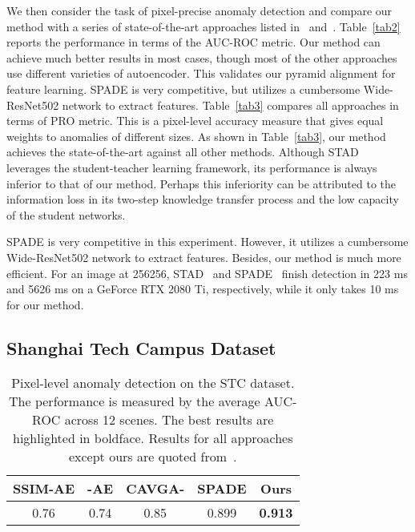 \documentclass[final]{cvpr}
\begin{document}
{We then consider the task of pixel-precise anomaly detection and compare our method with a series of state-of-the-art approaches listed in~\cite{Cohen2020} and~\cite{Bergmann2020}. Table~\ref{tab2} reports the performance in terms of the AUC-ROC metric. Our method can achieve much better results in most cases, though most of the other approaches use different varieties of autoencoder. This validates our pyramid alignment for feature learning. SPADE is very competitive, but utilizes a cumbersome Wide-ResNet502 network to extract features. Table~\ref{tab3} compares all approaches in terms of PRO metric. This is a pixel-level accuracy measure that gives equal weights to anomalies of different sizes. As shown in Table~\ref{tab3}, our method achieves the state-of-the-art against all other methods. Although STAD~\cite{Bergmann2020} leverages the student-teacher learning framework, its performance is always inferior to that of our method. Perhaps this inferiority can
be attributed to the information loss in its two-step knowledge transfer process and the low capacity of the student networks.

SPADE is very competitive in this experiment. However, it utilizes a cumbersome Wide-ResNet502 network to extract features. Besides, our method is much more efficient. For an image at 256256, STAD~\cite{Bergmann2020} and SPADE~\cite{Cohen2020} finish detection in 223 ms and 5626 ms on a GeForce RTX 2080 Ti, respectively, while it only takes 10 ms for our method. 


\subsection{Shanghai Tech Campus Dataset}
\label{sec4-sub3}

\begin{table}[!t]
	\centering
	\caption{Pixel-level anomaly detection on the STC dataset. The performance is measured by the average AUC-ROC across 12 scenes. The best results are highlighted in boldface. Results for all approaches except ours are quoted from~\cite{Cohen2020}.}
	\label{tab4}
	\vspace{0.5em}
	\begin{tabular}{c c c c c}
		\hline
		SSIM-AE & -AE& CAVGA-& SPADE & Ours\\
		\hline
		0.76 & 0.74 & 0.85  & 0.899 & \textbf{0.913} \\
		\hline
	\end{tabular}
\end{table}


}
\end{document}
